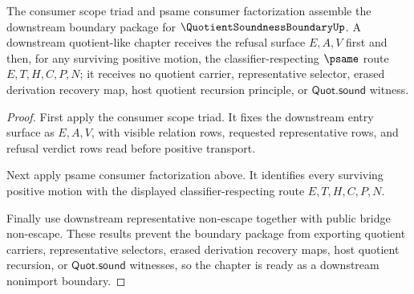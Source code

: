 \begin{theorem}
\label{thm:quotient-soundness-boundary-downstream-boundary-readiness}
The consumer scope triad and psame consumer factorization assemble the downstream boundary package for $\QuotientSoundnessBoundaryUp$. A downstream quotient-like chapter receives the refusal surface $E,A,V$ first and then, for any surviving positive motion, the classifier-respecting $\psame$ route $E,T,H,C,P,N$; it receives no quotient carrier, representative selector, erased derivation recovery map, host quotient recursion principle, or $\mathsf{Quot.sound}$ witness.
\end{theorem}
\begin{proof}
First apply the consumer scope triad. It fixes the downstream entry surface as $E,A,V$, with visible relation rows, requested representative rows, and refusal verdict rows read before positive transport.

Next apply psame consumer factorization above. It identifies every surviving positive motion with the displayed classifier-respecting route $E,T,H,C,P,N$.

Finally use downstream representative non-escape together with public bridge non-escape. These results prevent the boundary package from exporting quotient carriers, representative selectors, erased derivation recovery maps, host quotient recursion, or $\mathsf{Quot.sound}$ witnesses, so the chapter is ready as a downstream nonimport boundary.
\end{proof}

